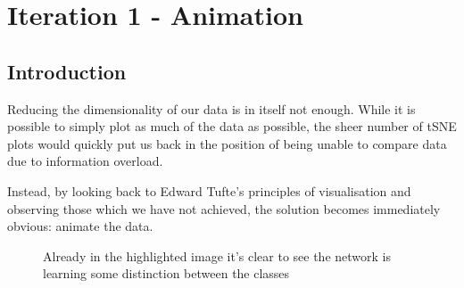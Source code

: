 \documentclass[a4paper,11pt,titlepage]{article}
\begin{document}
\clearpage

\section{Iteration 1 - Animation}
	\subsection{Introduction}
	Reducing the dimensionality of our data is in itself not enough. While it is possible to simply plot as much of the data as possible, the sheer number of tSNE plots would quickly put us back in the position of being unable to compare data due to information overload. 
	\par 
	Instead, by looking back to Edward Tufte's principles of visualisation and observing those which we have not achieved, the solution becomes immediately obvious: animate the data.
	\par 
	
	\begin{figure}[H]
    			\caption{Already in the highlighted image it's clear to see the network is learning some distinction between the classes}%
	\end{figure}	
	
\end{document}
